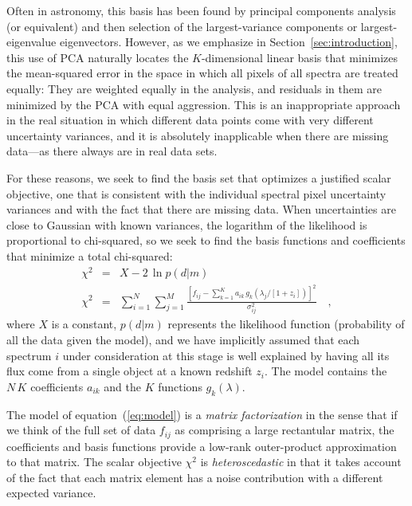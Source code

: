 \documentclass[12pt,preprint]{aastex}
\newcommand{\sectionname}{Section}
\newcommand{\equationname}{equation}
\begin{document}
Often in astronomy, this basis has been found by principal components
analysis (or equivalent) and then selection of the largest-variance
components or largest-eigenvalue eigenvectors.  However, as we
emphasize in \sectionname~\ref{sec:introduction}, this use of PCA
naturally locates the $K$-dimensional linear basis that minimizes the
mean-squared error in the space in which all pixels of all spectra are
treated equally: They are weighted equally in the analysis, and
residuals in them are minimized by the PCA with equal aggression. This
is an inappropriate approach in the real situation in which different
data points come with very different uncertainty variances, and it is
absolutely inapplicable when there are missing data---as there always
are in real data sets.

For these reasons, we seek to find the basis set that optimizes a
justified scalar objective, one that is consistent with the individual
spectral pixel uncertainty variances and with the fact that there are
missing data.  When uncertainties are close to Gaussian with known
variances, the logarithm of the likelihood is proportional to
chi-squared, so we seek to find the basis functions and coefficients
that minimize a total chi-squared:
\begin{eqnarray}\label{eq:chi-squared}\displaystyle
\chi^2 & = & X - 2\,\ln p(d|m) \nonumber\\
\chi^2 & = & \sum_{i=1}^N \sum_{j=1}^M
             \frac{\left[f_{ij}-\sum_{k=1}^K a_{ik}
                      \,g_k(\lambda_j/[1+z_i])\right]^2}
{\sigma^2_{ij}}
\quad ,
\end{eqnarray}
where $X$ is a constant, $p(d|m)$ represents the likelihood function
(probability of all the data given the model), and we have implicitly
assumed that each spectrum $i$ under consideration at this stage is
well explained by having all its flux come from a single object at a
known redshift $z_i$. The model contains the $N\,K$ coefficients
$a_{ik}$ and the $K$ functions $g_k(\lambda)$.

The model of \equationname~(\ref{eq:model}) is a \emph{matrix
  factorization} in the sense that if we think of the full set of data
$f_{ij}$ as comprising a large rectantular matrix, the coefficients
and basis functions provide a low-rank outer-product approximation to
that matrix.  The scalar objective $\chi^2$ is \emph{heteroscedastic}
in that it takes account of the fact that each matrix element has a
noise contribution with a different expected variance.
\end{document}
